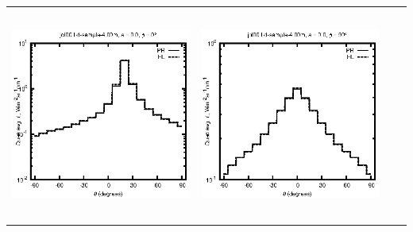 \begin{tabular}{c c c c}
\includegraphics[height=7cm]{../eps/jol00_Ld_sample_4.00m_fwd.eps} &
\includegraphics[height=7cm]{../eps/jol00_Ld_sample_4.00m_cross.eps} \\
\end{tabular}

\pagebreak

